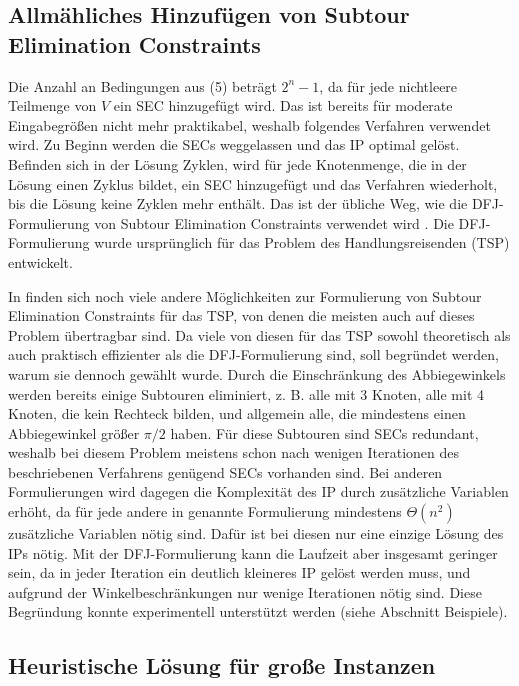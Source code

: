 \documentclass[a4paper, 10pt, ngerman]{article}
\begin{document}
\subsection{Allmähliches Hinzufügen von Subtour Elimination Constraints}

Die Anzahl an Bedingungen aus (5) beträgt $2^n - 1$, da für jede nichtleere Teilmenge von $V$ ein SEC hinzugefügt wird. Das ist bereits für moderate Eingabegrößen nicht mehr praktikabel, weshalb folgendes Verfahren verwendet wird. Zu Beginn werden die SECs weggelassen und das IP optimal gelöst. Befinden sich in der Lösung Zyklen, wird für jede Knotenmenge, die in der Lösung einen Zyklus bildet, ein SEC hinzugefügt und das Verfahren wiederholt, bis die Lösung keine Zyklen mehr enthält. Das ist der übliche Weg, wie die DFJ-Formulierung von Subtour Elimination Constraints verwendet wird \cite{tsp-formulations}. Die DFJ-Formulierung wurde ursprünglich für das Problem des Handlungsreisenden (TSP) entwickelt.

In \cite{tsp-formulations} finden sich noch viele andere Möglichkeiten zur Formulierung von Subtour Elimination Constraints für das TSP, von denen die meisten auch auf dieses Problem übertragbar sind. Da viele von diesen für das TSP sowohl theoretisch als auch praktisch effizienter als die DFJ-Formulierung sind, soll begründet werden, warum sie dennoch gewählt wurde. Durch die Einschränkung des Abbiegewinkels werden bereits einige Subtouren eliminiert, z. B. alle mit 3 Knoten, alle mit 4 Knoten, die kein Rechteck bilden, und allgemein alle, die mindestens einen Abbiegewinkel größer $\pi / 2$ haben. Für diese Subtouren sind SECs redundant, weshalb bei diesem Problem meistens schon nach wenigen Iterationen des beschriebenen Verfahrens genügend SECs vorhanden sind. Bei anderen Formulierungen wird dagegen die Komplexität des IP durch zusätzliche Variablen erhöht, da für jede andere in \cite{tsp-formulations} genannte Formulierung mindestens $\Theta(n^2)$ zusätzliche Variablen nötig sind. Dafür ist bei diesen nur eine einzige Lösung des IPs nötig. Mit der DFJ-Formulierung kann die Laufzeit aber insgesamt geringer sein, da in jeder Iteration ein deutlich kleineres IP gelöst werden muss, und aufgrund der Winkelbeschränkungen nur wenige Iterationen nötig sind. Diese Begründung konnte experimentell unterstützt werden (siehe Abschnitt Beispiele).

\subsection{Heuristische Lösung für große Instanzen}
\end{document}
